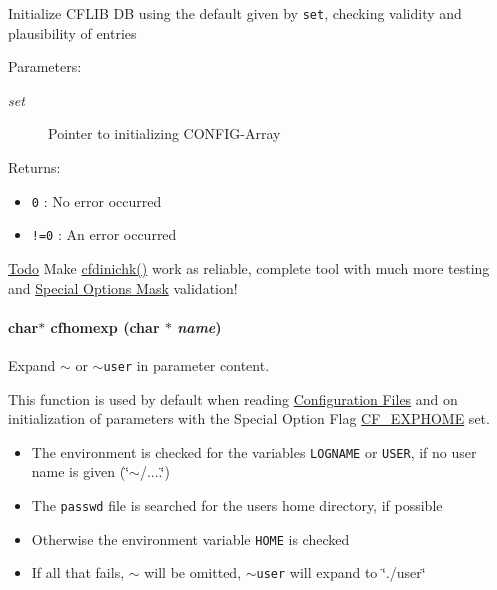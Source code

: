 Initialize CFLIB DB using the default given by {\tt set}, checking validity and plausibility of entries

\begin{Desc}
\item[Parameters:]
\begin{description}
\item[{\em set}]Pointer to initializing CONFIG-Array\end{description}
\end{Desc}
\begin{Desc}
\item[Returns:]\begin{itemize}
\item {\tt 0} : No error occurred \item {\tt !=0} : An error occurred\end{itemize}
\end{Desc}
\begin{Desc}
\item[\hyperlink{todo__todo000001}{Todo}]Make \hyperlink{group__advanced__features_g35e2c28f591ac71e3617c612233ecdd0}{cfdinichk()} work as reliable, complete tool with much more testing and \hyperlink{group__special__options__mask}{Special Options Mask} validation!\end{Desc}
\hypertarget{group__advanced__features_gb6f874ac347d273dc45ad011808fe703}{
\paragraph[{cfhomexp}]{\setlength{\rightskip}{0pt plus 5cm}char$\ast$ cfhomexp (char $\ast$ {\em name})}\hfill}
\label{group__advanced__features_gb6f874ac347d273dc45ad011808fe703}


Expand {\tt $\sim$} or {\tt $\sim$user} in parameter content. 

This function is used by default when reading \hyperlink{config_files}{Configuration Files} and on initialization of parameters with the Special Option Flag \hyperlink{group__special__options__mask_gff1b2e25aa9a89a55c1784018e24aa75}{CF\_\-EXPHOME} set.

\begin{itemize}
\item The environment is checked for the variables {\tt LOGNAME} or {\tt USER}, if no user name is given (\char`\"{}$\sim$/....\char`\"{})\item The {\tt passwd} file is searched for the users home directory, if possible\item Otherwise the environment variable {\tt HOME} is checked\item If all that fails, {\tt $\sim$} will be omitted, {\tt $\sim$user} will expand to \char`\"{}./user\char`\"{}\end{itemize}


